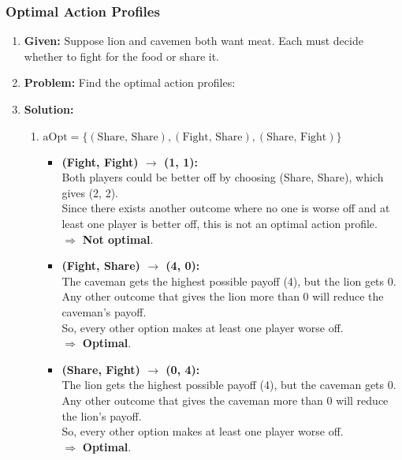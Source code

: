 \subsubsection{Optimal Action Profiles}
\begin{example}
    \begin{enumerate}
        \item \textbf{Given:} Suppose lion and cavemen both want meat. Each must decide whether to fight for the food or share it. 
        \item \textbf{Problem:} Find the optimal action profiles: 
        \item \textbf{Solution:}
        \begin{enumerate}
            \item $\text{aOpt} = \{(\text{Share, Share}), (\text{Fight, Share}), (\text{Share, Fight})\}$
            \begin{itemize}
                \item \textbf{(Fight, Fight) $\rightarrow$ (1, 1):} \\
                Both players could be better off by choosing (Share, Share), which gives (2, 2). \\
                Since there exists another outcome where no one is worse off and at least one player is better off, this is not an optimal action profile. \\
                $\Rightarrow$ \textbf{Not optimal}.
                
                \item \textbf{(Fight, Share) $\rightarrow$ (4, 0):} \\
                The caveman gets the highest possible payoff (4), but the lion gets 0. \\
                Any other outcome that gives the lion more than 0 will reduce the caveman’s payoff. \\
                So, every other option makes at least one player worse off. \\
                $\Rightarrow$ \textbf{Optimal}.
                
                \item \textbf{(Share, Fight) $\rightarrow$ (0, 4):} \\
                The lion gets the highest possible payoff (4), but the caveman gets 0. \\
                Any other outcome that gives the caveman more than 0 will reduce the lion’s payoff. \\
                So, every other option makes at least one player worse off. \\
                $\Rightarrow$ \textbf{Optimal}.
                

\end{itemize}
\end{enumerate}
\end{enumerate}
\end{example}
